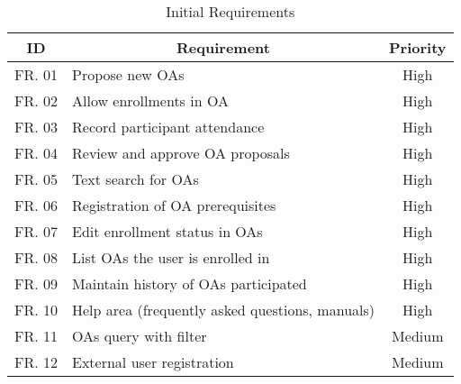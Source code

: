 \begin{table}[!htb]
  \centering
  \setlength{\aboverulesep}{0pt}
  \setlength{\belowrulesep}{0pt}
  \caption{Initial Requirements}
  \label{tab:initial-requirements}
  \footnotesize
  \begin{tabular}{c|l|c}
    \toprule
    \rowcolor[rgb]{0.753,0.753,0.753} \textbf{ID} & \multicolumn{1}{c|}{\textbf{Requirement}}                    & \textbf{Priority} \\
    \hline
    \rowcolor[rgb]{0.898,0.898,0.898} FR. 01      & Propose new OAs                                              & High              \\
    FR. 02                                        & Allow enrollments in OA                                      & High              \\
    \rowcolor[rgb]{0.898,0.898,0.898} FR. 03      & Record participant attendance                                & High              \\
    FR. 04                                        & Review and approve OA proposals                              & High              \\
    \rowcolor[rgb]{0.898,0.898,0.898} FR. 05      & Text search for OAs                                          & High              \\
    FR. 06                                        & Registration of OA prerequisites                             & High              \\
    \rowcolor[rgb]{0.898,0.898,0.898} FR. 07      & Edit enrollment status in OAs                                & High              \\
    FR. 08                                        & List OAs the user is enrolled in                             & High              \\
    \rowcolor[rgb]{0.898,0.898,0.898} FR. 09      & Maintain history of OAs participated                         & High              \\
    FR. 10                                        & Help area (frequently asked questions, manuals)              & High              \\
    \rowcolor[rgb]{0.898,0.898,0.898} FR. 11      & OAs query with filter                                        & Medium            \\
    FR. 12                                        & External user registration                                   & Medium            \\

\end{tabular}
\end{table}
